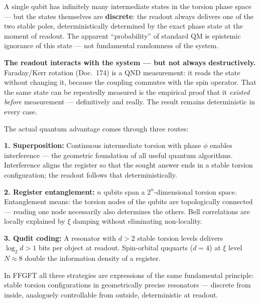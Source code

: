 \begin{conclusionBox}
A single qubit has infinitely many intermediate states
in the torsion phase space --- but the states themselves are
\textbf{discrete}: the readout always delivers one of the
two stable poles, deterministically determined by the
exact phase state at the moment of readout.
The apparent ``probability'' of standard QM
is epistemic ignorance of this state ---
not fundamental randomness of the system.

\textbf{The readout interacts with the system ---
but not always destructively.}
Faraday/Kerr rotation (Doc.~174) is a
QND measurement: it reads the state without changing it,
because the coupling commutes with the spin operator.
That the same state can be repeatedly measured
is the empirical proof that it \emph{existed before} measurement ---
definitively and really.
The result remains deterministic in every case.

The actual quantum advantage comes through three routes:

\textbf{1. Superposition:}
Continuous intermediate torsion with phase $\phi$
enables interference --- the geometric foundation
of all useful quantum algorithms.
Interference aligns the register so that
the sought answer ends in a stable torsion configuration;
the readout follows that deterministically.

\textbf{2. Register entanglement:}
$n$ qubits span a $2^n$-dimensional torsion space.
Entanglement means: the torsion nodes of the qubits
are topologically connected --- reading one
node necessarily also determines the others.
Bell correlations are locally explained by $\xi$ damping
without eliminating non-locality.

\textbf{3. Qudit coding:}
A resonator with $d > 2$ stable torsion levels
delivers $\log_2 d > 1$ bits per object at readout.
Spin-orbital ququarts ($d = 4$) at
$\xi$ level $N \approx 8$ double the
information density of a register.

In FFGFT all three strategies are expressions of the same
fundamental principle: stable torsion configurations
in geometrically precise resonators --- discrete from inside,
analoguely controllable from outside, deterministic at readout.
\end{conclusionBox}


